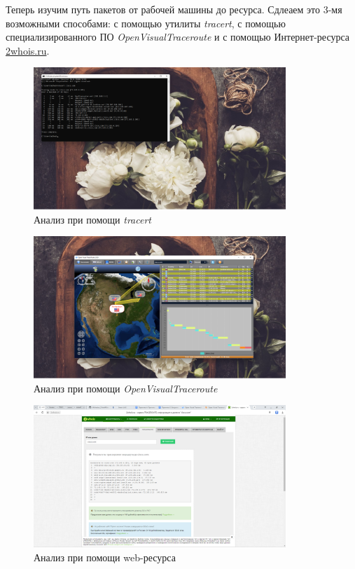 \documentclass[a4paper]{article}
\begin{document}
  Теперь изучим путь пакетов от рабочей машины до ресурса. Сдлеаем это 3-мя возможными способами:
  с помощью утилиты \textit{tracert}, с помощью специализированного ПО \textit{OpenVisualTraceroute}
  и с помощью Интернет-ресурса \href{https://2whois.ru/?t=traceroute}{2whois.ru}.

  \begin{figure}[H]
    \centering
    \includegraphics[width=0.85\textwidth]{05_0004}
    \caption{Анализ при помощи \textit{tracert}}
    \label{img:0004}
  \end{figure}

  \begin{figure}[H]
    \centering
    \includegraphics[width=0.85\textwidth]{05_0005}
    \caption{Анализ при помощи \textit{OpenVisualTraceroute}}
    \label{img:0005}
  \end{figure}
  
  \begin{figure}[H]
    \centering
    \includegraphics[width=0.85\textwidth]{05_0006}
    \caption{Анализ при помощи web-ресурса}
    \label{img:0006}
  \end{figure}
\end{document}
